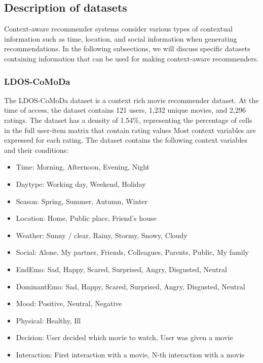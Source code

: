 \subsection{Description of datasets}\label{subsec:desc-of-datasets}
Context-aware recommender systems consider various types of contextual information such as time, location, and social information when generating recommendations\cite{aggarwal2016recommender}.
In the following subsections, we will discuss specific datasets containing information that can be used for making context-aware recommenders.

\subsubsection{LDOS-CoMoDa}\label{subsub:desc-comoda}
The LDOS-CoMoDa\cite{COMODA2013} dataset is a context rich movie recommender dataset\cite{comoda}.
At the time of access, the dataset contains 121 users, 1,232 unique movies, and 2,296 ratings.
The dataset has a density of 1.54\%, representing the percentage of cells in the full user-item matrix that contain rating values
Most context variables are expressed for each rating.
The dataset contains the following context variables and their conditions:
\begin{itemize}
    \item Time: Morning, Afternoon, Evening, Night
    \item Daytype: Working day, Weekend, Holiday
    \item Season: Spring, Summer, Autumn, Winter
    \item Location:  Home, Public place, Friend's house
    \item Weather: Sunny / clear, Rainy, Stormy, Snowy, Cloudy
    \item Social: Alone, My partner, Friends, Colleagues, Parents, Public, My family
    \item EndEmo: Sad, Happy, Scared, Surprised, Angry, Disgusted, Neutral
    \item DominantEmo: Sad, Happy, Scared, Surprised, Angry, Disgusted, Neutral
    \item Mood: Positive, Neutral, Negative
    \item Physical: Healthy, Ill
    \item Decision: User decided which movie to watch, User was given a movie
    \item Interaction: First interaction with a movie, N-th interaction with a movie
\end{itemize}
